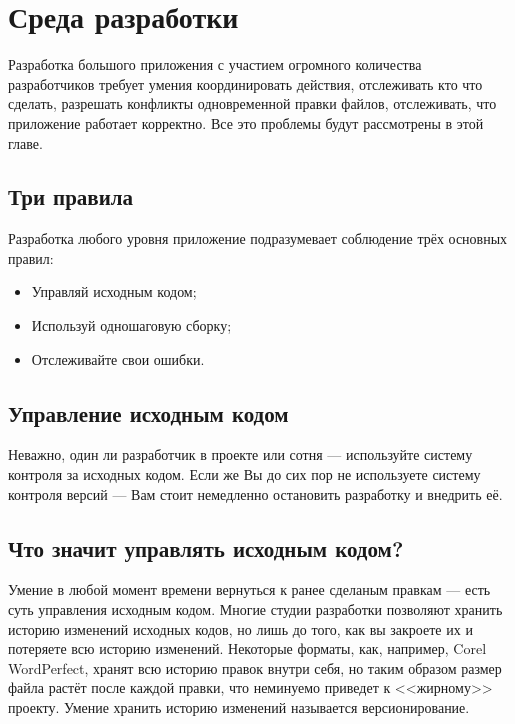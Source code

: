 \chapter{ Среда разработки } \label{chapt3}


Разработка большого приложения с участием огромного количества разработчиков требует умения координировать действия, отслеживать кто что сделать, разрешать конфликты одновременной правки файлов, отслеживать, что приложение работает корректно. Все это проблемы будут рассмотрены в этой главе.

\section{ Три правила} \label{sect3_1}

Разработка любого уровня приложение подразумевает соблюдение трёх основных правил:
\begin{itemize}
\item Управляй исходным кодом;
\item Используй одношаговую сборку;
\item Отслеживайте свои ошибки.

\end{itemize}

\section{ Управление исходным кодом} \label{sect3_2}

Неважно, один ли разработчик в проекте или сотня --- используйте систему контроля за исходных кодом. Если же Вы до сих пор не используете систему контроля версий --- Вам стоит немедленно остановить разработку и внедрить её.

\section{ Что значит управлять исходным кодом?} \label{sect3_3}

Умение в любой момент времени вернуться к ранее сделаным правкам --- есть суть управления исходным кодом. Многие студии разработки позволяют хранить историю изменений исходных кодов, но лишь до того, как вы закроете их и потеряете всю историю изменений. Некоторые форматы, как, например, Corel WordPerfect, хранят всю историю правок внутри себя, но таким образом размер файла растёт после каждой правки, что неминуемо приведет к <<жирному>> проекту. Умение хранить историю изменений называется версионирование.

